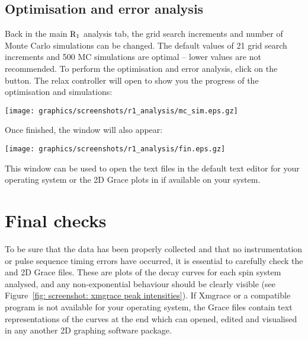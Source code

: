 
\subsection{Optimisation and error analysis}

Back in the main $\mathrm{R}_1$ analysis tab, the grid search increments and number of Monte Carlo simulations can be changed.  The default values of 21 grid search increments and 500 MC simulations are optimal -- lower values are not recommended.  To perform the optimisation and error analysis, click on the  button.  The relax controller will open to show you the progress of the optimisation and simulations:

\begin{minipage}[h]{\linewidth}
\centerline{\texttt{[image: graphics/screenshots/r1\_analysis/mc\_sim.eps.gz]}}
\end{minipage}

Once finished, the  window will also appear:

\begin{minipage}[h]{\linewidth}
\centerline{\texttt{[image: graphics/screenshots/r1\_analysis/fin.eps.gz]}}
\end{minipage}

This window can be used to open the text files in the default text editor for your operating system or the 2D Grace plots in  if available on your system.




\section{Final checks}

To be sure that the data has been properly collected and that no instrumentation or pulse sequence timing errors have occurred, it is essential to carefully check the  and  2D Grace files.  These are plots of the decay curves for each spin system analysed, and any non-exponential behaviour should be clearly visible (see Figure~\ref{fig: screenshot: xmgrace peak intensities}).  If Xmgrace or a compatible program is not available for your operating system, the Grace files contain text representations of the curves at the end which can opened, edited and visualised in any another 2D graphing software package.
 
